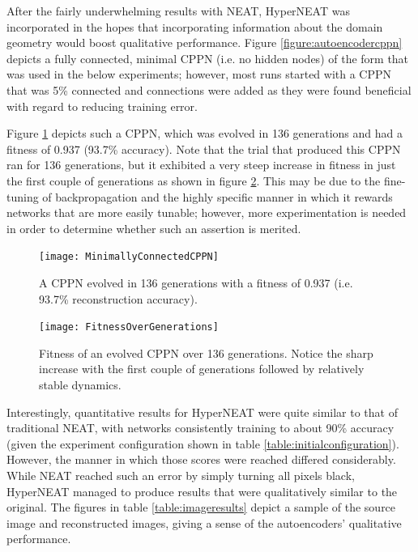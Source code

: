 \documentclass{acm_proc_article-sp}
\begin{document}
After the fairly underwhelming results with NEAT, HyperNEAT was incorporated in the hopes that incorporating information about the domain geometry would boost qualitative performance.  Figure \ref{figure:autoencodercppn} depicts a fully connected, minimal CPPN (i.e. no hidden nodes) of the form that was used in the below experiments; however, most runs started with a CPPN that was 5\% connected and connections were added as they were found beneficial with regard to reducing training error.  

Figure \ref{figure:minimallyconnectedcppn} depicts such a CPPN, which was evolved in 136 generations and had a fitness of 0.937 (93.7\% accuracy).  Note that the trial that produced this CPPN ran for 136 generations, but it exhibited a very steep increase in fitness in just the first couple of generations as shown in figure \ref{figure:fitnessovergenerations}.  This may be due to the fine-tuning of backpropagation and the highly specific manner in which it rewards networks that are more easily tunable; however, more experimentation is needed in order to determine whether such an assertion is merited.

\begin{figure}[h]
	\caption{A CPPN evolved in 136 generations with a fitness of 0.937 (i.e. 93.7\% reconstruction accuracy).}
	\centering
	\texttt{[image: MinimallyConnectedCPPN]}
	\label{figure:minimallyconnectedcppn}
\end{figure}

\begin{figure}[h]
	\caption{Fitness of an evolved CPPN over 136 generations.  Notice the sharp increase with the first couple of generations followed by relatively stable dynamics.}
	\centering
	\texttt{[image: FitnessOverGenerations]}
	\label{figure:fitnessovergenerations}
\end{figure}

Interestingly, quantitative results for HyperNEAT were quite similar to that of traditional NEAT, with networks consistently training to about 90\% accuracy (given the experiment configuration shown in table \ref{table:initialconfiguration}). However, the manner in which those scores were reached differed considerably.  While NEAT reached such an error by simply turning all pixels black, HyperNEAT managed to produce results that were qualitatively similar to the original.  The figures in table \ref{table:imageresults} depict a sample of the source image and reconstructed images, giving a sense of the autoencoders' qualitative performance.
\end{document}
